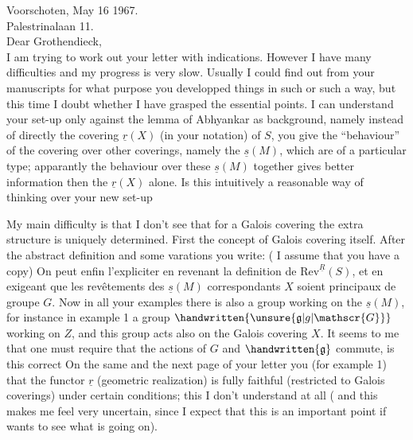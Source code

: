 Voorschoten, May 16 1967.\\
Palestrinalaan 11.\\

Dear Grothendieck,\\

I am trying to work out your letter with indications. However I have many difficulties and my progress is very slow. Usually I could find out from your manuscripts for what purpose you developped things in such or such a way, but this time I doubt whether I have grasped the essential points. I can understand your set-up only against the lemma of Abhyankar as background, namely instead of  directly the covering $\underline{r}(X)$ (in your notation) of $S$, you give the ``behaviour'' of the covering over other coverings, namely the $\underline{s}(M)$, which are of a particular type; apparantly the behaviour over  these $\underline{s}(M)$ together gives better information then the $\underline{r}(X)$ alone. Is this intuitively a reasonable way of thinking over your new set-up

My main difficulty is that I don't see that for a Galois covering the extra structure is uniquely determined. First the concept of Galois covering itself. After the abstract definition and some varations you write: ( I assume that you have a copy) On peut enfin l'expliciter en revenant  la definition de $\mathrm{Rev}^{\underline{R}}(S)$, et en exigeant que les revêtements des $\underline{s}(M)$ correspondants  $X$ soient principaux de groupe $G$. Now in all your examples there is also a group working on the $\underline{s}(M)$, for instance in example 1 a group $\handwritten{\unsure{\mathfrak{g}|g|\mathscr{G}}}$ working on $Z$, and this group acts also on the Galois covering  $X$. It seems to me that one must require that the actions of $G$ and $\handwritten{\mathfrak{g}}$ commute, is this correct On the same and the next page of your letter you  (for example 1) that the functor $\underline{r}$ (geometric realization) is fully faithful (restricted to Galois coverings) under certain conditions; this I don't understand at all ( and  this makes me feel very uncertain, since I expect that this is an important point  if  wants to see what is going on\handwritten{!}).

